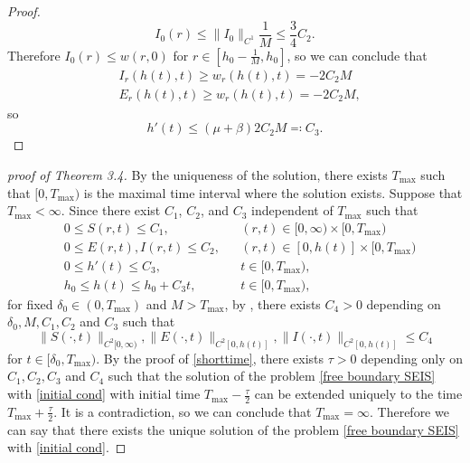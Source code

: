 \documentclass[11pt]{amsart}
\numberwithin{equation}{section}
\theoremstyle{plain}
\theoremstyle{definition}
\begin{document}
\begin{proof}
\begin{equation*}
			I_0(r) \leq \lVert I_0 \rVert _{C^1} \frac{1}{M} \leq \frac{3}{4} C_2.
		\end{equation*}
		Therefore $I_0(r) \leq w(r,0)$ for $r \in [h_0-\frac{1}{M},h_0]$, so we can conclude that
		\begin{equation*}
			\begin{aligned}
				&I_r(h(t),t) \geq w_r(h(t),t)=-2C_2M\\
				&E_r(h(t),t) \geq w_r(h(t),t)=-2C_2M,
			\end{aligned}
		\end{equation*}
		so
		\begin{equation*}
			h'(t) \leq (\mu + \beta) 2C_2 M \eqqcolon C_3.
		\end{equation*}
	\end{proof}
	
	\begin{proof}[proof of Theorem 3.4]
		
		By the uniqueness of the solution, there exists $T_{\max}$ such that $[0,T_{\max})$ is the maximal time interval where the solution exists.
		Suppose that $T_{\max}<\infty$. Since there exist $C_1$, $C_2$, and $C_3$ independent of $T_{\max}$ such that
		\begin{equation*}
			\begin{aligned}
				&0\leq S(r,t) \leq C_1, \qquad &&(r,t) \in [0,\infty) \times [0, T_{\max}) \\
				&0 \leq E(r,t), I(r,t) \leq C_2, &&(r,t) \in [0,h(t)] \times [0, T_{\max}) \\
				&0 \leq h'(t) \leq C_3, &&t \in [0, T_{\max}), \\
				&h_0 \leq h(t) \leq h_0+C_3t, &&t \in [0,T_{\max}),
			\end{aligned}
		\end{equation*}
		for fixed $\delta_0 \in (0,T_{\max})$ and $M>T_{\max}$, by , there exists $C_4>0$ depending on $\delta_0, M, C_1, C_2$ and $C_3$ such that
		\begin{equation*}
			\lVert S(\cdot,t)\rVert_{C^2[0,\infty)},\lVert E(\cdot,t)\rVert_{C^2[0,h(t)]},\lVert I(\cdot,t)\rVert_{C^2[0,h(t)]} \leq C_4
		\end{equation*}
		for $t\in [\delta_0,T_{\max})$.
		By the proof of \cref{shorttime}, there exists $\tau>0$ depending only on $C_1, C_2, C_3$ and $C_4$ such that the solution of the problem \cref{free boundary SEIS} with \cref{initial cond} with initial time $T_{\max}-\frac{\tau}{2}$ can be extended uniquely to the time $T_{\max}+\frac{\tau}{2}$.
		It is a contradiction, so we can conclude that $T_{\max}=\infty$.
		Therefore we can say that there exists the unique solution of the problem \cref{free boundary SEIS} with \cref{initial cond}.
	\end{proof}
	
\end{document}
